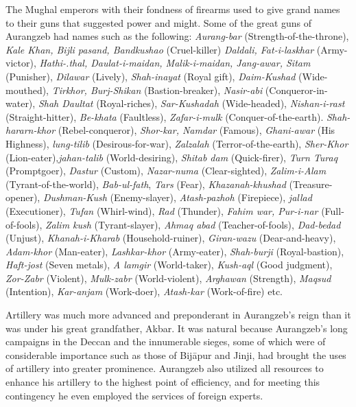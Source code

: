 The Mughal emperors with their fondness of firearms used to give grand names to their guns that suggested power and might. Some of the great guns of Aurangzeb had names such as the follow­ing: {\it Aurang-bar} (Strength-of-the-throne), {\it Kale Khan, Bijli pasand, Band­kushao} (Cruel-killer) {\it Daldali, Fat-i-laskhar} (Army-victor), {\it Hathi-.thal, Daulat-i-maidan, Malik-i-maidan, Jang-awar, Sitam} (Punisher), {\it Dilawar} (Lively), {\it Shah-inayat} (Royal gift), {\it Daim-Kushad} (Wide-mouthed), {\it Tir­khor, Burj-Shikan} (Bastion-breaker), {\it Nasir-abi} (Conqueror-in-water), {\it Shah Daultat} (Royal-riches), {\it Sar-Kushadah} (Wide-headed), {\it Nishan-i­-rast} (Straight-hitter), {\it Be-khata} (Faultless), {\it Zafar-i-mulk} (Conquer-of­-the-earth). {\it Shah-hararn-khor} (Rebel-conqueror), {\it Shor-kar, Namdar} (Famous), {\it Ghani-awar} (His Highness), {\it lung-tilib} (Desirous-for-war), {\it Zalzalah} (Terror-of-the-earth), {\it Sher-Khor} (Lion-eater),{\it  jahan-talib} (World-desiring), {\it Shitab dam} (Quick-firer), {\it Turn Turaq} (Prompt­goer), {\it Dastur} (Custom), {\it Nazar-numa} (Clear-sighted), {\it Zalim-i-Alam} (Tyrant-of-the-world), {\it Bab-ul-fath}, {\it Tars} (Fear), {\it Khazanah-khushad} (Treasure-opener), {\it Dushman-Kush} (Enemy-slayer), {\it Atash-pazhoh} (Fire­piece), {\it jallad} (Executioner), {\it Tufan} (Whirl-wind), {\it Rad} (Thunder), {\it Fahim war, Pur-i-nar} (Full-of-fools), {\it Zalim kush} (Tyrant-slayer), {\it Ahmaq abad} (Teacher-of-fools), {\it Dad-bedad} (Unjust), {\it Khanah-i-Kharab} (Household-ruiner), {\it Giran-wazu} (Dear-and-heavy), {\it Adam-khor} (Man-eater), {\it Lashkar-khor} (Army-eater), {\it Shah-burji} (Royal-bastion), {\it Haft-jost} (Seven metals), {\it A lamgir} (World-taker), {\it Kush-aql} (Good­ judgment), {\it Zor-Zabr} (Violent), {\it Mulk-zabr} (World-violent), {\it Arghawan} (Strength), {\it Maqsud} (Intention), {\it Kar-anjam} (Work-doer), {\it Atash-kar} (Work-of-fire) etc.

Artillery was much more advanced and preponderant in Aurangzeb's reign than it was under his great grandfather, Akbar. It was natural because Aurangzeb's long campaigns in the Deccan and the innumer­able sieges, some of which were of considerable importance such as those of Bijāpur and Jinji, had brought the uses of artillery into greater prominence. Aurangzeb also utilized all resources to enhance his artillery to the highest point of efficiency, and for meeting this contingency he even employed the services of foreign experts.

